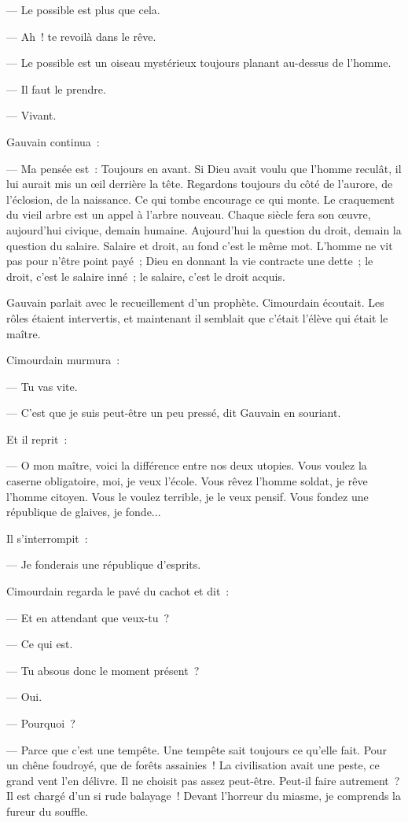 \documentclass[french,twoside]{book} %
\begin{document}
— Le possible est plus que cela.\par
— Ah ! te revoilà dans le rêve.\par
— Le possible est un oiseau mystérieux toujours planant au-dessus de l’homme.\par
— Il faut le prendre.\par
— Vivant.\par
Gauvain continua :\par
 — Ma pensée est : Toujours en avant. Si Dieu avait voulu que l’homme reculât, il lui aurait mis un œil derrière la tête. Regardons toujours du côté de l’aurore, de l’éclosion, de la naissance. Ce qui tombe encourage ce qui monte. Le craquement du vieil arbre est un appel à l’arbre nouveau. Chaque siècle fera son œuvre, aujourd’hui civique, demain humaine. Aujourd’hui la question du droit, demain la question du salaire. Salaire et droit, au fond c’est le même mot. L’homme ne vit pas pour n’être point payé ; Dieu en donnant la vie contracte une dette ; le droit, c’est le salaire inné ; le salaire, c’est le droit acquis.\par
Gauvain parlait avec le recueillement d’un prophète. Cimourdain écoutait. Les rôles étaient intervertis, et maintenant il semblait que c’était l’élève qui était le maître.\par
Cimourdain murmura :\par
— Tu vas vite.\par
— C’est que je suis peut-être un peu pressé, dit Gauvain en souriant.\par
Et il reprit :\par
— O mon maître, voici la différence entre nos deux utopies. Vous voulez la caserne obligatoire, moi, je veux l’école. Vous rêvez l’homme soldat, je rêve l’homme citoyen. Vous le voulez terrible, je le veux pensif. Vous fondez une république de glaives, je fonde...\par
Il s’interrompit :\par
— Je fonderais une république d’esprits.\par
Cimourdain regarda le pavé du cachot et dit :\par
 — Et en attendant que veux-tu ?\par
— Ce qui est.\par
— Tu absous donc le moment présent ?\par
— Oui.\par
— Pourquoi ?\par
— Parce que c’est une tempête. Une tempête sait toujours ce qu’elle fait. Pour un chêne foudroyé, que de forêts assainies ! La civilisation avait une peste, ce grand vent l’en délivre. Il ne choisit pas assez peut-être. Peut-il faire autrement ? Il est chargé d’un si rude balayage ! Devant l’horreur du miasme, je comprends la fureur du souffle.\par
\end{document}
